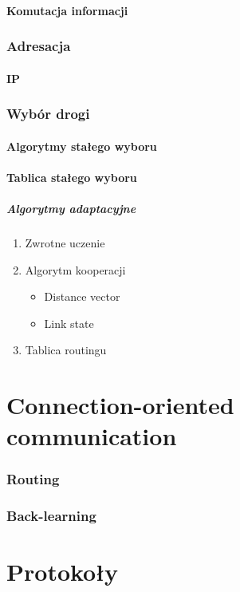 \documentclass[a4paper,twoside]{article}
\begin{document}
	\subsection{Komutacja informacji}
\section{Adresacja}
	\subsection{IP}
\section{Wybór drogi}
	\subsection{Algorytmy stałego wyboru}
	\subsection{Tablica stałego wyboru}
		\subsubsection{Algorytmy adaptacyjne}
		\begin{enumerate}
			\item Zwrotne uczenie
			\item Algorytm kooperacji
			\begin{itemize}
				\item Distance vector
				\item Link state
			\end{itemize}
			\item Tablica routingu
		\end{enumerate}
		
		
\part{Connection-oriented communication}
\section{Routing}
\section{Back-learning}
	
	
\part{Protokoły}
\end{document}
